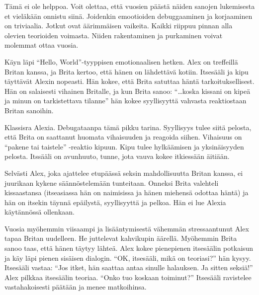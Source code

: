 Tämä ei ole helppoa. Voit olettaa, että vuosien päästä näiden sanojen lukemisesta et vieläkään onnistu siinä. Joidenkin emootioiden debuggaaminen ja korjaaminen on triviaalia. Jotkut ovat äärimmäisen vaikeita. Kaikki riippuu pinnan alla olevien teorioiden voimasta. Niiden rakentaminen ja purkaminen voivat molemmat ottaa vuosia.

Käyn läpi ``Hello, World''-tyyppisen emotionaalisen hetken. Alex on treffeillä Britan kanssa, ja Brita kertoo, että hänen on lähdettävä kotiin. Itsesääli ja kipu täyttävät Alexin nopeasti. Hän kokee, että Brita satuttaa häntä tarkoituksellisest. Hän on salaisesti vihainen Britalle, ja kun Brita sanoo: ``\ldots koska kissani on kipeä ja minun on tarkistettava tilanne\vmq{,}'' hän kokee syyllisyyttä vahvasta reaktiostaan Britan sanoihin.

Klassisra Alexia. Debugataanpa tämä pikku tarina. Syyllisyys tulee siitä pelosta, että Brita on saattanut huomata vihaisuuden ja reagoida siihen. Vihaisuus on ``pakene tai taistele'' -reaktio kipuun. Kipu tulee hylkäämisen ja yksinäisyyden pelosta. Itssääli on avunhuuto, tunne, jota vauva kokee itkiessään äitiään.

Selvästi Alex, joka ajattelee etupäässä seksin mahdollisuutta Britan kanssa, ei juurikaan kykene säännöstelemään tunteitaan. Onneksi Brita valehteli kissaastansa (itseasiassa hän on naimisissa ja hänen miehensä odottaa häntä) ja hän on itsekin täynnä epäilystä, syyllisyyttä ja pelkoa. Hän ei lue Alexia käytännössä ollenkaan.

Vuosia myöhemmin viisaampi ja lisääntymisestä vähemmän stressaantunut Alex tapaa Britan uudelleen. He juttelevat kahvikupin äärellä. Myöhemmin Brita sanoo taas, että hänen täytyy lähteä. Alex kokee pienepienen itsesäälin potkaisun ja käy läpi pienen sisäisen dialogin. ``OK, itsesääli, mikä on teoriasi?'' hän kysyy. Itsesääli vastaa: ``Jos itket, hän saattaa antaa sinulle halauksen. Ja sitten seksiä!'' Alex pilkkaa itsesäälin teoriaa. ``Onko tuo koskaan toiminut?'' Itsesääli ravistelee vastahakoisesti päätään ja menee matkoihinsa.

